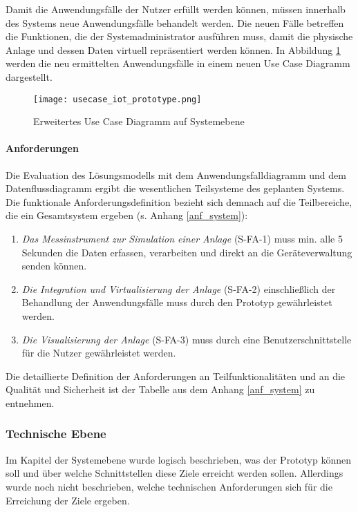 Damit die Anwendungsfälle der Nutzer erfüllt werden können, müssen innerhalb des Systems neue Anwendungsfälle behandelt werden. Die neuen Fälle betreffen die Funktionen, die der Systemadministrator ausführen muss, damit die physische Anlage und dessen Daten virtuell repräsentiert werden können. In Abbildung \ref{usecasediagram} werden die neu ermittelten Anwendungsfälle in einem neuen Use Case Diagramm dargestellt.

\begin{figure}[ht!]
  \centering
  \texttt{[image: usecase\_iot\_prototype.png]}
  \caption[Erweitertes Use Case Diagramm auf Systemebene]{Erweitertes Use Case Diagramm auf Systemebene}
  \label{usecasediagram}
\end{figure}
\paragraph{Anforderungen}

Die Evaluation des Lösungsmodells mit dem Anwendungsfalldiagramm und dem Datenflussdiagramm ergibt die wesentlichen Teilsysteme des geplanten Systems. Die funktionale Anforderungsdefinition bezieht sich demnach auf die Teilbereiche, die ein Gesamtsystem ergeben (s. Anhang \ref{anf_system}):
\begin{enumerate}
  \item \textit{Das Messinstrument zur Simulation einer Anlage} (S-FA-1) muss min. alle 5 Sekunden die Daten erfassen, verarbeiten und direkt an die Geräteverwaltung senden können.
  \item \textit{Die Integration und Virtualisierung der Anlage} (S-FA-2) einschließlich der Behandlung der Anwendungsfälle muss durch den Prototyp gewährleistet werden.
  \item \textit{Die Visualisierung der Anlage} (S-FA-3) muss durch eine Benutzerschnittstelle für die Nutzer gewährleistet werden.
\end{enumerate}

\noindent Die detaillierte Definition der Anforderungen an Teilfunktionalitäten und an die Qualität und Sicherheit ist der Tabelle aus dem Anhang \ref{anf_system} zu entnehmen.

\subsubsection{Technische Ebene}
Im Kapitel der Systemebene wurde logisch beschrieben, was der Prototyp können soll und über welche Schnittstellen diese Ziele erreicht werden sollen. Allerdings wurde noch nicht beschrieben, welche technischen Anforderungen sich für die Erreichung der Ziele ergeben.

